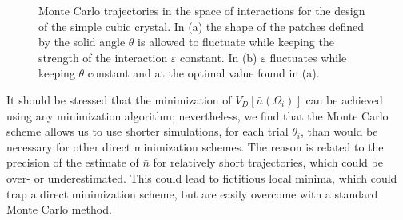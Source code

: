 \begin{figure}
	\begin{center}

	 \end{center}
	\caption[MC trajectories in interaction space for the design of simple cubic crystals]{Monte Carlo trajectories in the space of interactions for the design of the simple cubic crystal. In (a) the shape of the patches defined by the solid angle $\theta$ is allowed to fluctuate while keeping the strength of the interaction $\varepsilon$ constant. In (b) $\varepsilon$ fluctuates while keeping $\theta$ constant and at the optimal value found in (a).}	\label{trajectory} 
\end{figure}

It should be stressed that the minimization of $V_D[\bar n(\Omega_i)]$ can be achieved using any minimization algorithm; nevertheless, we find that the Monte Carlo scheme allows us to use shorter simulations, for each trial $\theta_i$, than would be necessary for other direct minimization schemes.
The reason is related to the precision of the estimate of $\bar n$ for relatively short trajectories, which could be 
over- or underestimated.
This could lead to fictitious local minima, which could trap a direct minimization scheme, but are easily overcome with a standard Monte Carlo method.
 
